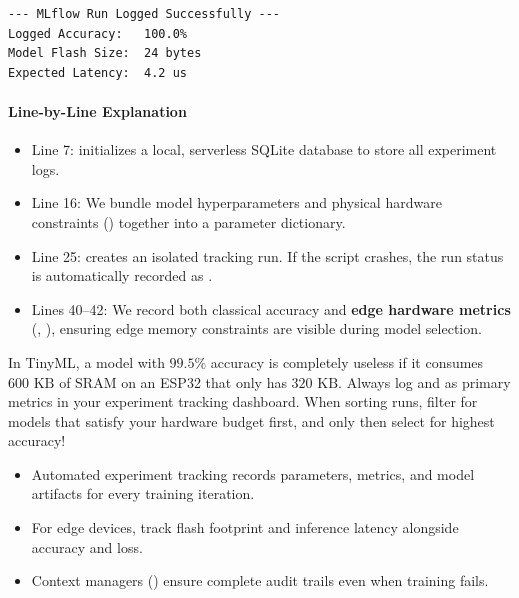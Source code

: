 \begin{lstlisting}[style=outputstyle]
--- MLflow Run Logged Successfully ---
Logged Accuracy:   100.0%
Model Flash Size:  24 bytes
Expected Latency:  4.2 us
\end{lstlisting}

\paragraph{Line-by-Line Explanation}
\begin{itemize}
    \item Line 7:  initializes a local, serverless SQLite database to store all experiment logs.
    \item Line 16: We bundle model hyperparameters and physical hardware constraints () together into a parameter dictionary.
    \item Line 25:  creates an isolated tracking run. If the script crashes, the run status is automatically recorded as .
    \item Lines 40--42: We record both classical accuracy and \textbf{edge hardware metrics} (, ), ensuring edge memory constraints are visible during model selection.
\end{itemize}

\begin{iotbox}
In TinyML, a model with $99.5\%$ accuracy is completely useless if it consumes $600\text{ KB}$ of SRAM on an ESP32 that only has $320\text{ KB}$. Always log  and  as primary metrics in your experiment tracking dashboard. When sorting runs, filter for models that satisfy your hardware budget first, and only then select for highest accuracy!
\end{iotbox}

\begin{takeaways}
\begin{itemize}
    \item Automated experiment tracking records parameters, metrics, and model artifacts for every training iteration.
    \item For edge devices, track flash footprint and inference latency alongside accuracy and loss.
    \item Context managers () ensure complete audit trails even when training fails.
\end{itemize}
\end{takeaways}

